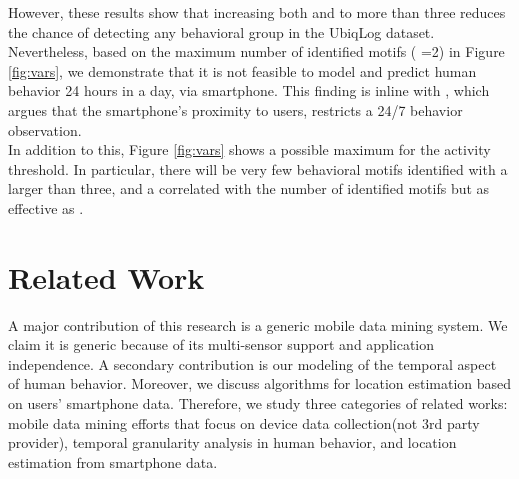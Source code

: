 \documentclass{sig-alternate}
\begin{document}
However, these results show that increasing both  and  to more than three reduces the chance of detecting any behavioral group in the UbiqLog dataset. Nevertheless, based on the maximum number of identified motifs ( =2) in Figure \ref{fig:vars}, we demonstrate that it is not feasible to model and predict human behavior 24 hours in a day, via smartphone. This finding is inline with \cite{gettingcloser}, which argues that the smartphone's proximity to users, restricts a 24/7 behavior observation.\\
In addition to this, Figure \ref{fig:vars} shows a possible maximum for the activity threshold. In particular, there will be very few behavioral motifs identified with a  larger than three, and a  correlated with the number of identified motifs but as effective as .
\vspace{-0.2cm}
\section{Related Work}
A major contribution of this research is a generic mobile data mining system. We claim it is generic because of its multi-sensor support and application independence. A secondary contribution is our modeling of the temporal aspect of human behavior. Moreover, we discuss algorithms for location estimation based on users' smartphone data. Therefore, we study three categories of related works: mobile data mining efforts that focus on device data collection(not 3rd party provider), temporal granularity analysis in human behavior, and location estimation from smartphone data. 
\vspace{-0.1cm}
\end{document}

